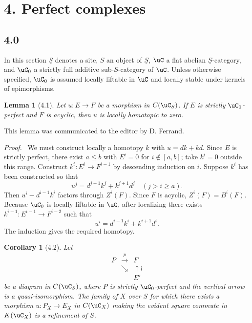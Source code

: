 \documentclass[11pt]{article}
\theoremstyle{plain}
\newtheorem*{lemma*}{Lemma}
\newtheorem*{corollary*}{Corollary}
\theoremstyle{definition}
\theoremstyle{remark}
\newenvironment{prooftext}{\par\noindent\textit{Proof.}\ }{\par\medskip}
\providecommand{\uS}{\underline{S}}
\begin{document}
\section*{4. Perfect complexes}

\subsection*{4.0}
In this section $\uS$ denotes a site, $S$ an object of $\uS$, $\uC$ a flat abelian $\uS$-category, and $\uC_0$ a strictly full additive sub-$\uS$-category of $\uC$. Unless otherwise specified, $\uC_0$ is assumed locally liftable in $\uC$ and locally stable under kernels of epimorphisms.

\begin{lemma*}[4.1]
Let $u:E\to F$ be a morphism in $C(\uC_S)$. If $E$ is strictly $\uC_0$-perfect and $F$ is acyclic, then $u$ is locally homotopic to zero.
\end{lemma*}

This lemma was communicated to the editor by D. Ferrand.

\begin{prooftext}
We must construct locally a homotopy $k$ with $u=dk+kd$. Since $E$ is strictly perfect, there exist $a\leq b$ with $E^i=0$ for $i\notin[a,b]$; take $k^i=0$ outside this range. Construct $k^i:E^i\to F^{i-1}$ by descending induction on $i$. Suppose $k^i$ has been constructed so that
\[
u^j=d^{j-1}k^j+k^{j+1}d^j\quad(j>i\geq a).
\]
Then $u^i-d^{i-1}k^i$ factors through $Z^i(F)$. Since $F$ is acyclic, $Z^i(F)=B^i(F)$. Because $\uC_0$ is locally liftable in $\uC$, after localizing there exists $k^{i-1}:E^{i-1}\to F^{i-2}$ such that
\[
u^i=d^{i-1}k^i+k^{i+1}d^i.
\]
The induction gives the required homotopy.
\end{prooftext}

\begin{corollary*}[4.2]
Let
\[
\begin{array}{ccc}
P&\xrightarrow{p}&F\\
&\searrow&\uparrow\wr\\
&&E'
\end{array}
\]
be a diagram in $C(\uC_S)$, where $P$ is strictly $\uC_0$-perfect and the vertical arrow is a quasi-isomorphism. The family of $X$ over $S$ for which there exists a morphism $u:P_X\to E_X$ in $C(\uC_X)$ making the evident square commute in $K(\uC_X)$ is a refinement of $S$.
\end{corollary*}
\end{document}
